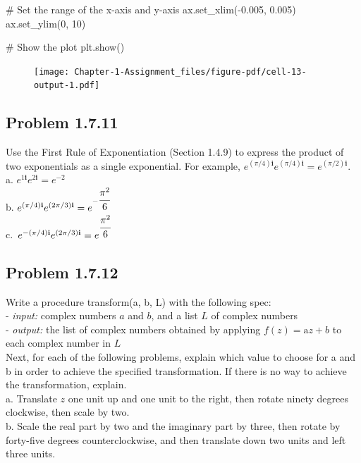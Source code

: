 \documentclass[
  letterpaper,
  DIV=11,
  numbers=noendperiod]{scrartcl}
\newenvironment{Shaded}{\begin{snugshade}}{\end{snugshade}}
\newcommand{\CommentTok}[1]{\textcolor[rgb]{0.37,0.37,0.37}{#1}}
\newcommand{\DecValTok}[1]{\textcolor[rgb]{0.68,0.00,0.00}{#1}}
\newcommand{\FloatTok}[1]{\textcolor[rgb]{0.68,0.00,0.00}{#1}}
\newcommand{\NormalTok}[1]{\textcolor[rgb]{0.00,0.23,0.31}{#1}}
\newcommand{\OperatorTok}[1]{\textcolor[rgb]{0.37,0.37,0.37}{#1}}
\begin{document}
\begin{Shaded}
\begin{Highlighting}[numbers=left,,]
\CommentTok{\# Set the range of the x{-}axis and y{-}axis}
\NormalTok{ax.set\_xlim(}\OperatorTok{{-}}\FloatTok{0.005}\NormalTok{, }\FloatTok{0.005}\NormalTok{)}
\NormalTok{ax.set\_ylim(}\DecValTok{0}\NormalTok{, }\DecValTok{10}\NormalTok{)}

\CommentTok{\# Show the plot}
\NormalTok{plt.show()}
\end{Highlighting}
\end{Shaded}

\begin{figure}[H]

{\centering \texttt{[image: Chapter-1-Assignment\_files/figure-pdf/cell-13-output-1.pdf]}

}

\end{figure}

\hypertarget{problem-1.7.11}{%
\subsection{Problem 1.7.11}\label{problem-1.7.11}}

Use the First Rule of Exponentiation (Section 1.4.9) to express the
product of two exponentials as a single exponential. For example,
\({e^{(\pi/4)\mathbf i}}{e^{(\pi/4)\mathbf i}}=e^{(\pi/2)\mathbf i}\).\\
a. \(e^{1\mathbf i}e^{2\mathbf i} = e^{-2}\)\\
b.
\(e^{(\pi/4)\mathbf i}e^{(2\pi/3)\mathbf i} = e^{-\cfrac{\pi^2}{6}}\)\\
c.~\(e^{-(\pi/4)\mathbf i}e^{(2\pi/3)\mathbf i} = e^{\cfrac{\pi^2}{6}}\)

\hypertarget{problem-1.7.12}{%
\subsection{Problem 1.7.12}\label{problem-1.7.12}}

Write a procedure transform(a, b, L) with the following spec:\\
- \emph{input:} complex numbers \(a\) and \(b\), and a list \(L\) of
complex numbers\\
- \emph{output:} the list of complex numbers obtained by applying
\(f(z) = \mathrm{a}z + b\) to each complex number in \(L\)\\
Next, for each of the following problems, explain which value to choose
for a and b in order to achieve the specified transformation. If there
is no way to achieve the transformation, explain.\\
a. Translate \(z\) one unit up and one unit to the right, then rotate
ninety degrees clockwise, then scale by two.\\
b. Scale the real part by two and the imaginary part by three, then
rotate by forty-five degrees counterclockwise, and then translate down
two units and left three units.
\end{document}
